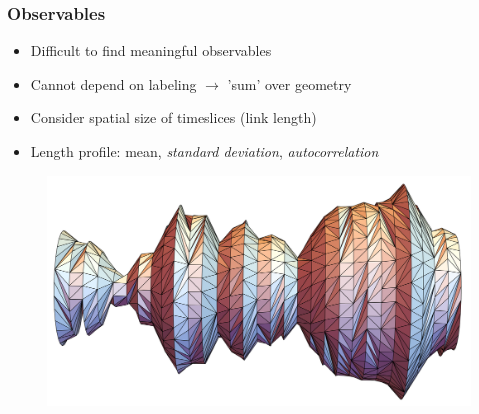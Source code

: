 
\begin{frame}
    \frametitle{Observables}

    
    \begin{itemize}
        \item Difficult to find meaningful observables
        \item Cannot depend on labeling $\rightarrow$ 'sum' over geometry
        \item Consider spatial size of timeslices (link length)
        \item Length profile: mean, \emph{standard deviation}, \emph{autocorrelation}
    \end{itemize}
    \begin{figure}
       \centering
       \includegraphics[width=0.6\linewidth]{img/triangulation.pdf}    
    \end{figure}
\end{frame}


